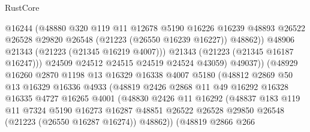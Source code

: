 \begin{lexlean}{RustCore}
\begin{coremodule}
                              @16244
                              (@48880
                                @320
                                @119
                                @11
                                @12678
                                @5190
                                @16226
                                @16239
                                @48893
                                @26522
                                @26528
                                @29820
                                @26548
                                (@21223 (@26550 @16239 @16227))
                                @48862))
                            @48906
                            @21343
                            (@21223 (@21345 @16219 @4007)))
                          @21343
                          (@21223 (@21345 @16187 @16247)))
                        @24509
                        @24512
                        @24515
                        @24519
                        @24524
                        @43059)
                      @49037))
                  (@48929
                    @16260
                    @2870
                    @1198
                    @13
                    @16329
                    @16338
                    @4007
                    @5180
                    (@48812
                      @2869
                      @50
                      @13
                      @16329
                      @16336
                      @4933
                      (@48819
                        @2426
                        @2868
                        @11
                        @49
                        @16292
                        @16328
                        @16335
                        @4727
                        @16265
                        @4001
                        (@48830
                          @2426
                          @11
                          @16292
                          (@48837
                            @183
                            @119
                            @11
                            @7324
                            @5190
                            @16273
                            @16287
                            @48851
                            @26522
                            @26528
                            @29850
                            @26548
                            (@21223 (@26550 @16287 @16274))
                            @48862))
                        (@48819
                          @2866
                          @266

\end{coremodule}
\end{lexlean}
